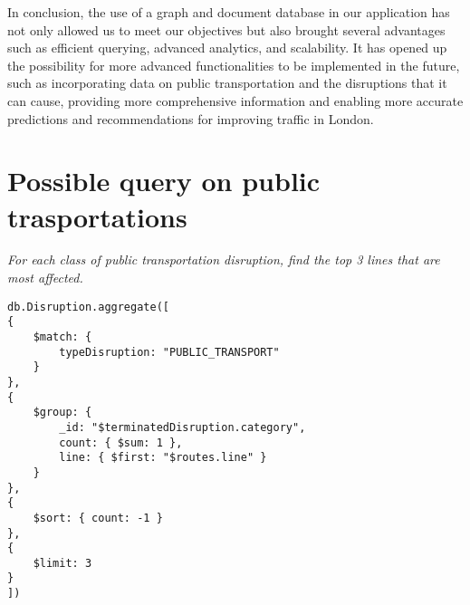 In conclusion, the use of a graph and document database in our application has not only allowed us to meet our objectives but also brought several advantages such as efficient querying, advanced analytics, and scalability. It has opened up the possibility for more advanced functionalities to be implemented in the future, such as incorporating data on public transportation and the disruptions that it can cause, providing more comprehensive information and enabling more accurate predictions and recommendations for improving traffic in London.

\section{Possible query on public trasportations}

\textit{For each class of public transportation disruption, find the top 3  lines that are most affected.}


\begin{lstlisting}
db.Disruption.aggregate([
{
	$match: {
		typeDisruption: "PUBLIC_TRANSPORT"
	}
},
{
	$group: {
		_id: "$terminatedDisruption.category",
		count: { $sum: 1 },
		line: { $first: "$routes.line" }
	}
},
{
	$sort: { count: -1 }
},
{
	$limit: 3
}
])
\end{lstlisting}

